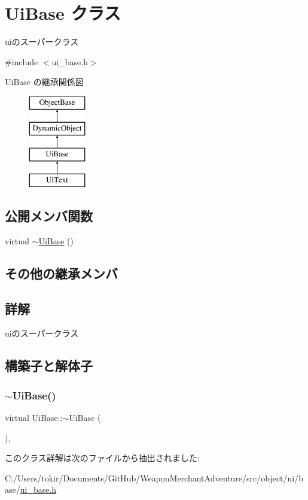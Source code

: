 \hypertarget{class_ui_base}{}\section{Ui\+Base クラス}
\label{class_ui_base}


uiのスーパークラス  




{\ttfamily \#include $<$ui\+\_\+base.\+h$>$}

Ui\+Base の継承関係図\begin{figure}[H]
\begin{center}
\leavevmode
\includegraphics[height=4.000000cm]{class_ui_base}
\end{center}
\end{figure}
\subsection*{公開メンバ関数}
\begin{DoxyCompactItemize}
\item 
virtual \mbox{\hyperlink{class_ui_base_ac8713016ee88ba89e36897f3bbf72743}{$\sim$\+Ui\+Base}} ()
\end{DoxyCompactItemize}
\subsection*{その他の継承メンバ}


\subsection{詳解}
uiのスーパークラス 

\subsection{構築子と解体子}
\mbox{\label{class_ui_base_ac8713016ee88ba89e36897f3bbf72743}} 
\subsubsection{\texorpdfstring{$\sim$\+Ui\+Base()}{~UiBase()}}
{\footnotesize\ttfamily virtual Ui\+Base\+::$\sim$\+Ui\+Base (\begin{DoxyParamCaption}{ }\end{DoxyParamCaption})\hspace{0.3cm}{\ttfamily [inline]}, {\ttfamily [virtual]}}



このクラス詳解は次のファイルから抽出されました\+:\begin{DoxyCompactItemize}
\item 
C\+:/\+Users/tokir/\+Documents/\+Git\+Hub/\+Weapon\+Merchant\+Adventure/src/object/ui/base/\mbox{\hyperlink{ui__base_8h}{ui\+\_\+base.\+h}}\end{DoxyCompactItemize}
